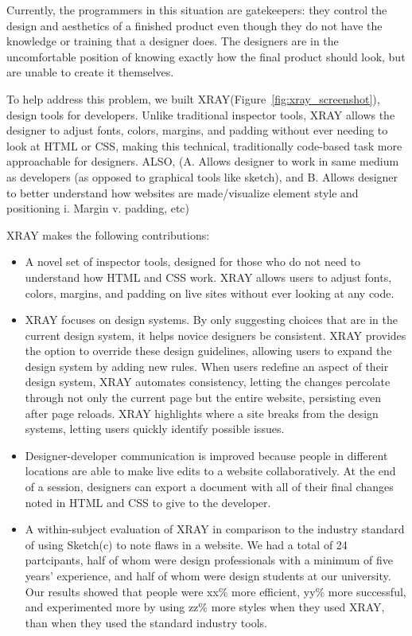 \documentclass{sigchi}
\newcommand{\xray}{XRAY\xspace}
\begin{document}
Currently, the programmers in this situation are gatekeepers: they control the design and aesthetics of a finished product even though they do not have the knowledge or training that a designer does. The designers are in the uncomfortable position of knowing exactly how the final product should look, but are unable to create it themselves. 


To help address this problem, we built \xray (Figure~\ref{fig:xray_screenshot}), design tools for developers. Unlike traditional inspector tools, \xray allows the designer to adjust fonts, colors, margins, and padding without ever needing to look at HTML or CSS, making this technical, traditionally code-based task more approachable for designers. ALSO, (A. Allows designer to work in same medium as developers (as opposed to graphical tools like sketch), and B. Allows designer to better understand how websites are made/visualize element style and positioning
i. Margin v. padding, etc)

\xray makes the following contributions: 

\begin{itemize}
    \item A novel set of inspector tools, designed for those who do not need to understand how HTML and CSS work. \xray allows users to adjust fonts, colors, margins, and padding on live sites without ever looking at any code. 
    
    \item \xray focuses on design systems. By only suggesting choices that are in the current design system, it helps novice designers be consistent. \xray provides the option to override these design guidelines, allowing users to expand the design system by adding new rules. When users redefine an aspect of their design system, \xray automates consistency, letting the changes percolate through not only the current page but the entire website, persisting even after page reloads. \xray highlights where a site breaks from the design systems, letting users quickly identify possible issues. 
    
    \item Designer-developer communication is improved because people in different locations are able to make live edits to a website collaboratively. At the end of a session, designers can export a document with all of their final changes noted in HTML and CSS to give to the developer.  
    
    \item A within-subject evaluation of \xray in comparison to the industry standard of using Sketch(c) to note flaws in a website. We had a total of 24 partcipants, half of whom were design professionals with a minimum of five years' experience, and half of whom were design students at our university. Our results showed that people were xx\% more efficient, yy\% more successful, and experimented more by using zz\% more styles when they used \xray, than when they used the standard industry tools.

\end{itemize}
\end{document}
